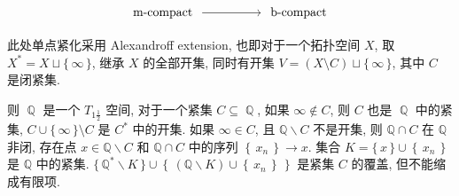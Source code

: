 \documentclass[options]{article}
\begin{document}
\[
		\begin{tikzcd}
			\text { m-compact }\ar[rr]&& \text { b-compact }
		\end{tikzcd}
\]
\begin{remark}
	此处单点紧化采用 Alexandroff extension, 也即对于一个拓扑空间 $X$, 取 $X^*=X\sqcup\{\,\infty\,\}$, 继承 $X$ 的全部开集, 同时有开集 $V=(X\setminus C)\sqcup\{\,\infty\,\}$, 其中 $C$ 是闭紧集.

	则 $\BbbQ$ 是一个 $T_{1\frac{1}{2}}$ 空间, 对于一个紧集 $C\subseteq \BbbQ$, 如果 $\infty\not\in C$, 则 $C$ 也是 $\BbbQ$ 中的紧集, $C\cup\{\,\infty\,\}\setminus C$ 是 $C^*$ 中的开集. 如果 $\infty\in C$, 且 $\mathbb{Q} \backslash C$ 不是开集, 则 $\mathbb{Q} \cap C$ 在 $\mathbb{Q}$ 非闭, 存在点 $x \in \mathbb{Q} \backslash C$ 和 $\mathbb{Q} \cap C$ 中的序列 $\left\{\,x_n\,\right\}\to x$. 集合 $K=\{\,x\,\} \cup\left\{\,x_n\,\right\}$ 是 $\mathbb{Q}$ 中的紧集. $\{\,\mathbb{Q}^* \backslash K\,\} \cup\left\{\,(\mathbb{Q} \backslash K) \cup\left\{\,x_n\,\right\}\,\right\}$ 是紧集 $C$ 的覆盖, 但不能缩成有限项.
\end{remark}
\end{document}
